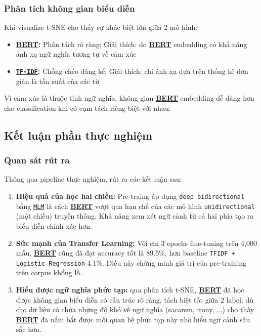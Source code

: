 \subsubsection{Phân tích không gian biểu diễn}

Khi visualize t-SNE cho thấy sự khác biệt lớn giữa 2 mô hình:
\begin{itemize}
    \item \textbf{\hyperref[acro:bert]{\textbf{BERT}}:} Phân tách rõ ràng; Giải thích: do \hyperref[acro:bert]{\textbf{BERT}} embedding có khả năng ánh xạ ngữ nghĩa tương tự về cảm xúc
    \item \textbf{\hyperref[acro:tfidf]{\texttt{TF-IDF}}:} Chồng chéo đáng kể; Giải thích: chỉ ánh xạ dựa trên thống kê đơn giản là tần suất của các từ
\end{itemize}

Vì cảm xúc là thuộc tính ngữ nghĩa, không gian \hyperref[acro:bert]{\textbf{BERT}} embedding dễ dàng hơn cho classification khi có cụm tách riêng biệt với nhau.


\subsection{Kết luận phần thực nghiệm}
\label{ssec:thao_luan_ket_luan}

\subsubsection{Quan sát rút ra}
Thông qua pipeline thực nghiệm, rút ra các kết luận sau:
\begin{enumerate}
    \item \textbf{Hiệu quả của học hai chiều:} Pre-traing áp dụng \texttt{deep bidirectional} bằng \hyperref[acro:mlm]{\texttt{MLM}} là cách \hyperref[acro:bert]{\textbf{BERT}} vượt qua hạn chế của các mô hình \texttt{unidirectional} (một chiều) truyền thống. Khả năng xem xét ngữ cảnh từ cả hai phía tạo ra biểu diễn chính xác hơn.
    
    \item \textbf{Sức mạnh của Transfer Learning:} Với chỉ 3 epochs fine-tuning trên 4,000 mẫu, \hyperref[acro:bert]{\textbf{BERT}} cũng đã đạt accuracy tốt là 89.5\%, hơn baseline \texttt{TFIDF + Logistic Regression} 4.1\%. Điều này chứng minh giá trị của pre-training trên corpus khổng lồ.
    
    \item \textbf{Hiểu được ngữ nghĩa phức tạp:} qua phân tích t-SNE, \hyperref[acro:bert]{\textbf{BERT}} đã học được không gian biểu diễn có cấu trúc rõ ràng, tách biệt tốt giữa 2 label; dù cho dữ liệu có chứa những độ khó về ngữ nghĩa (sacarsm, irony, ...) cho thấy \hyperref[acro:bert]{\textbf{BERT}} đã nắm bắt được mối quan hệ phức tạp này nhờ hiểu ngữ cảnh sâu sắc hơn.
\end{enumerate}

